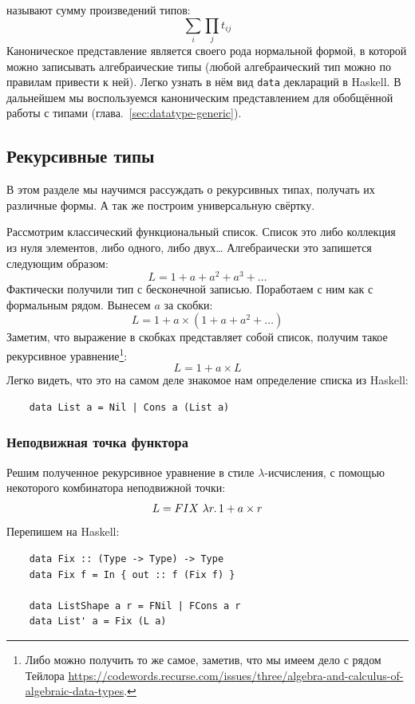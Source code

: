  называют сумму произведений типов:
\[
    \sum_{i}\prod_{j} t_{ij}
\]
Каноническое представление является своего рода нормальной формой, в которой можно записывать алгебраические типы (любой алгебраический тип можно по правилам привести к ней).
Легко узнать в нём вид \texttt{data} деклараций в Haskell.
В дальнейшем мы воспользуемся каноническим представлением для обобщённой работы с типами (глава.~\ref{sec:datatype-generic}).


\subsection{Рекурсивные типы} \label{subsec:recursive-types}

В этом разделе мы научимся рассуждать о рекурсивных типах, получать их различные формы.
А так же построим универсальную свёртку.

Рассмотрим классический функциональный список.
Список это либо коллекция из нуля элементов, либо одного, либо двух\ldots
Алгебраически это запишется следующим образом:
\[
    L = 1 + a + a^2 + a^3 + \ldots
\]
Фактически получили тип с бесконечной записью.
Поработаем с ним как с формальным рядом.
Вынесем $a$ за скобки:
\[
    L = 1 + a \times (1 + a + a^2 + \ldots)
\]
Заметим, что выражение в скобках представляет собой список, получим такое рекурсивное уравнение\footnote{Либо можно получить то же самое, заметив, что мы имеем дело с рядом Тейлора \url{https://codewords.recurse.com/issues/three/algebra-and-calculus-of-algebraic-data-types}.}:
\[
    L = 1 + a \times L
\]
Легко видеть, что это на самом деле знакомое нам определение списка из Haskell:
\begin{verbatim}
    data List a = Nil | Cons a (List a)
\end{verbatim}


\subsubsection{Неподвижная точка функтора}

Решим полученное рекурсивное уравнение в стиле $\lambda$-исчисления, с помощью некоторого комбинатора неподвижной точки:
\[
    L = FIX~\lambda r\ldotp 1 + a \times r
\] %
Перепишем на Haskell:
\begin{verbatim}
    data Fix :: (Type -> Type) -> Type
    data Fix f = In { out :: f (Fix f) }

    data ListShape a r = FNil | FCons a r
    data List' a = Fix (L a)
\end{verbatim}

